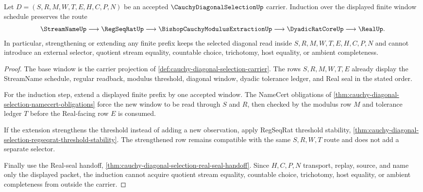 \begin{theorem}
\label{thm:cauchy-diagonal-selection-finite-window-induction}
Let $D=(S,R,M,W,T,E,H,C,P,N)$ be an accepted $\CauchyDiagonalSelectionUp$ carrier. Induction over the displayed finite window schedule preserves the route
$$
\StreamNameUp \longrightarrow \RegSeqRatUp \longrightarrow \BishopCauchyModulusExtractionUp \longrightarrow \DyadicRatCoreUp \longrightarrow \RealUp .
$$
In particular, strengthening or extending any finite prefix keeps the selected diagonal read inside $S,R,M,W,T,E,H,C,P,N$ and cannot introduce an external selector, quotient stream equality, countable choice, trichotomy, host equality, or ambient completeness.
\end{theorem}
\begin{proof}
The base window is the carrier projection of \autoref{def:cauchy-diagonal-selection-carrier}. The rows $S,R,M,W,T,E$ already display the StreamName schedule, regular readback, modulus threshold, diagonal window, dyadic tolerance ledger, and Real seal in the stated order.

For the induction step, extend a displayed finite prefix by one accepted window. The NameCert obligations of \autoref{thm:cauchy-diagonal-selection-namecert-obligations} force the new window to be read through $S$ and $R$, then checked by the modulus row $M$ and tolerance ledger $T$ before the Real-facing row $E$ is consumed.

If the extension strengthens the threshold instead of adding a new observation, apply RegSeqRat threshold stability, \autoref{thm:cauchy-diagonal-selection-regseqrat-threshold-stability}. The strengthened row remains compatible with the same $S,R,W,T$ route and does not add a separate selector.

Finally use the Real-seal handoff, \autoref{thm:cauchy-diagonal-selection-real-seal-handoff}. Since $H,C,P,N$ transport, replay, source, and name only the displayed packet, the induction cannot acquire quotient stream equality, countable choice, trichotomy, host equality, or ambient completeness from outside the carrier.
\end{proof}

